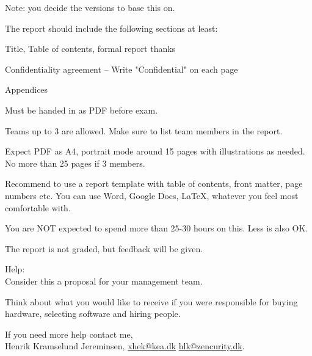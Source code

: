 \documentclass[a4paper,11pt,notitlepage,landscape]{report}
\begin{document}
Note: you decide the versions to base this on.

The report should include the following sections at least:
\begin{list2}
\item Title, Table of contents, formal report thanks
\item Confidentiality agreement -- Write "Confidential" on each page
\item Appendices
\end{list2}


Must be handed in as PDF before exam.

Teams up to 3 are allowed. Make sure to list team members in the report.

Expect PDF as A4, portrait mode around 15 pages with illustrations as needed.
No more than 25 pages if 3 members.

Recommend to use a report template with table of contents, front matter, page numbers etc. You can use Word, Google Docs, \LaTeX, whatever you feel most comfortable with.

You are NOT expected to spend more than 25-30 hours on this. Less is also OK.

The report is not graded, but feedback will be given.

Help:\\
Consider this a proposal for your management team.

Think about what you would like to receive if you were responsible for buying hardware, selecting software and hiring people.

If you need more help contact me,\\


Henrik Kramselund Jereminsen, \url{xhek@kea.dk} \url{hlk@zencurity.dk}.
\end{document}
